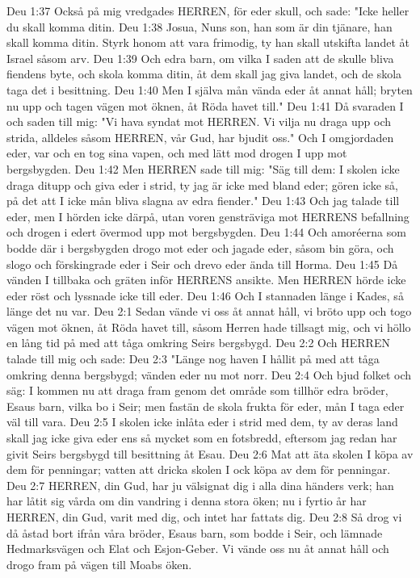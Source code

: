 Deu 1:37  Också på mig vredgades HERREN, för eder skull, och sade: "Icke heller du skall komma ditin.
Deu 1:38  Josua, Nuns son, han som är din tjänare, han skall komma ditin. Styrk honom att vara frimodig, ty han skall utskifta landet åt Israel såsom arv.
Deu 1:39  Och edra barn, om vilka I saden att de skulle bliva fiendens byte, och skola komma ditin, åt dem skall jag giva landet, och de skola taga det i besittning.
Deu 1:40  Men I själva mån vända eder åt annat håll; bryten nu upp och tagen vägen mot öknen, åt Röda havet till."
Deu 1:41  Då svaraden I och saden till mig: "Vi hava syndat mot HERREN. Vi vilja nu draga upp och strida, alldeles såsom HERREN, vår Gud, har bjudit oss." Och I omgjordaden eder, var och en tog sina vapen, och med lätt mod drogen I upp mot bergsbygden.
Deu 1:42  Men HERREN sade till mig: "Säg till dem: I skolen icke draga ditupp och giva eder i strid, ty jag är icke med bland eder; gören icke så, på det att I icke mån bliva slagna av edra fiender."
Deu 1:43  Och jag talade till eder, men I hörden icke därpå, utan voren gensträviga mot HERRENS befallning och drogen i edert övermod upp mot bergsbygden.
Deu 1:44  Och amoréerna som bodde där i bergsbygden drogo mot eder och jagade eder, såsom bin göra, och slogo och förskingrade eder i Seir och drevo eder ända till Horma.
Deu 1:45  Då vänden I tillbaka och gräten inför HERRENS ansikte. Men HERREN hörde icke eder röst och lyssnade icke till eder.
Deu 1:46  Och I stannaden länge i Kades, så länge det nu var.
Deu 2:1  Sedan vände vi oss åt annat håll, vi bröto upp och togo vägen mot öknen, åt Röda havet till, såsom Herren hade tillsagt mig, och vi höllo en lång tid på med att tåga omkring Seirs bergsbygd.
Deu 2:2  Och HERREN talade till mig och sade:
Deu 2:3  "Länge nog haven I hållit på med att tåga omkring denna bergsbygd; vänden eder nu mot norr.
Deu 2:4  Och bjud folket och säg: I kommen nu att draga fram genom det område som tillhör edra bröder, Esaus barn, vilka bo i Seir; men fastän de skola frukta för eder, mån I taga eder väl till vara.
Deu 2:5  I skolen icke inlåta eder i strid med dem, ty av deras land skall jag icke giva eder ens så mycket som en fotsbredd, eftersom jag redan har givit Seirs bergsbygd till besittning åt Esau.
Deu 2:6  Mat att äta skolen I köpa av dem för penningar; vatten att dricka skolen I ock köpa av dem för penningar.
Deu 2:7  HERREN, din Gud, har ju välsignat dig i alla dina händers verk; han har låtit sig vårda om din vandring i denna stora öken; nu i fyrtio år har HERREN, din Gud, varit med dig, och intet har fattats dig.
Deu 2:8  Så drog vi då åstad bort ifrån våra bröder, Esaus barn, som bodde i Seir, och lämnade Hedmarksvägen och Elat och Esjon-Geber. Vi vände oss nu åt annat håll och drogo fram på vägen till Moabs öken.
